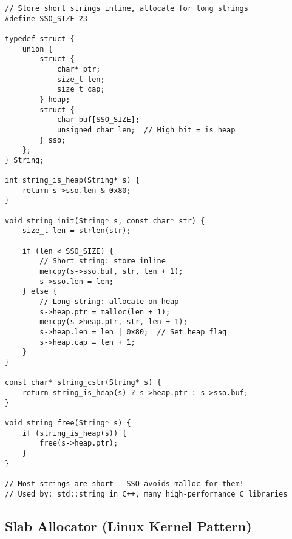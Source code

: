 \begin{lstlisting}
// Store short strings inline, allocate for long strings
#define SSO_SIZE 23

typedef struct {
    union {
        struct {
            char* ptr;
            size_t len;
            size_t cap;
        } heap;
        struct {
            char buf[SSO_SIZE];
            unsigned char len;  // High bit = is_heap
        } sso;
    };
} String;

int string_is_heap(String* s) {
    return s->sso.len & 0x80;
}

void string_init(String* s, const char* str) {
    size_t len = strlen(str);

    if (len < SSO_SIZE) {
        // Short string: store inline
        memcpy(s->sso.buf, str, len + 1);
        s->sso.len = len;
    } else {
        // Long string: allocate on heap
        s->heap.ptr = malloc(len + 1);
        memcpy(s->heap.ptr, str, len + 1);
        s->heap.len = len | 0x80;  // Set heap flag
        s->heap.cap = len + 1;
    }
}

const char* string_cstr(String* s) {
    return string_is_heap(s) ? s->heap.ptr : s->sso.buf;
}

void string_free(String* s) {
    if (string_is_heap(s)) {
        free(s->heap.ptr);
    }
}

// Most strings are short - SSO avoids malloc for them!
// Used by: std::string in C++, many high-performance C libraries
\end{lstlisting}

\subsection{Slab Allocator (Linux Kernel Pattern)}

